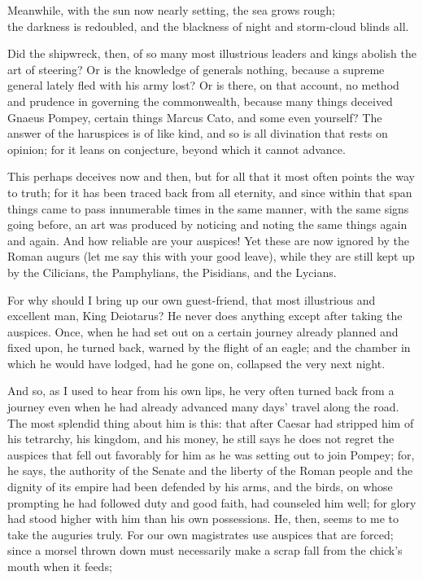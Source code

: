 Meanwhile, with the sun now nearly setting, the sea grows rough; \\
the darkness is redoubled, and the blackness of night and storm-cloud blinds all.

Did the shipwreck, then, of so many most illustrious leaders and kings abolish the art of steering? Or is the knowledge of generals nothing, because a supreme general lately fled with his army lost? Or is there, on that account, no method and prudence in governing the commonwealth, because many things deceived Gnaeus Pompey, certain things Marcus Cato, and some even yourself? The answer of the haruspices is of like kind, and so is all divination that rests on opinion; for it leans on conjecture, beyond which it cannot advance.

 This perhaps deceives now and then, but for all that it most often points the way to truth; for it has been traced back from all eternity, and since within that span things came to pass innumerable times in the same manner, with the same signs going before, an art was produced by noticing and noting the same things again and again. And how reliable are your auspices! Yet these are now ignored by the Roman augurs (let me say this with your good leave), while they are still kept up by the Cilicians, the Pamphylians, the Pisidians, and the Lycians.

 For why should I bring up our own guest-friend, that most illustrious and excellent man, King Deiotarus? He never does anything except after taking the auspices. Once, when he had set out on a certain journey already planned and fixed upon, he turned back, warned by the flight of an eagle; and the chamber in which he would have lodged, had he gone on, collapsed the very next night.

 And so, as I used to hear from his own lips, he very often turned back from a journey even when he had already advanced many days' travel along the road. The most splendid thing about him is this: that after Caesar had stripped him of his tetrarchy, his kingdom, and his money, he still says he does not regret the auspices that fell out favorably for him as he was setting out to join Pompey; for, he says, the authority of the Senate and the liberty of the Roman people and the dignity of its empire had been defended by his arms, and the birds, on whose prompting he had followed duty and good faith, had counseled him well; for glory had stood higher with him than his own possessions. He, then, seems to me to take the auguries truly. For our own magistrates use auspices that are forced; since a morsel thrown down must necessarily make a scrap fall from the chick's mouth when it feeds;

